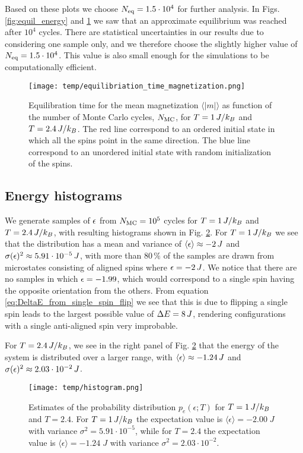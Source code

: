 Based on these plots we choose $N_\mathrm{eq}=1.5\cdot10^4$ for further analysis. In Figs. \ref{fig:equil_energy} and \ref{fig:equil_magn} we saw that an approximate equilibrium was reached after $10^4$ cycles. There are statistical uncertainties in our results due to considering one sample only, and we therefore choose the slightly higher value of $N_\mathrm{eq}=1.5\cdot10^4$. This value is also small enough for the simulations to be computationally efficient.

\begin{figure}[!ht]
    \texttt{[image: temp/equilibriation\_time\_magnetization.png]}
    \caption{Equilibration time for the mean magnetization $\langle \vert m \vert \rangle$ as function of the number of Monte Carlo cycles, $N_\mathrm{MC}$, for $T=1\,J/k_B$ and $T=2.4\,J/k_B$. The red line correspond to an ordered initial state in which all the spins point in the same direction. The blue line correspond to an unordered initial state with random initialization of the spins.}
    \label{fig:equil_magn}
\end{figure}

\subsection{Energy histograms}\label{subsec_results:histogram}
We generate samples of $\epsilon$ from $N_\mathrm{MC}=10^5$ cycles for $T=1\,J/k_B$ and $T=2.4\,J/k_B$, with resulting histograms shown in Fig. \ref{fig:histogram}. For $T=1\,J/k_B$ we see that the distribution has a mean and variance of $\expval{\epsilon}\approx-2\,J$ and $\sigma(\epsilon)^2\approx5.91\cdot10^{-5}\,J$, with more than $80\,\%$ of the samples are drawn from microstates consisting of aligned spins where $\epsilon=-2\,J$. We notice that there are no samples in which $\epsilon=-1.99$, which would correspond to a single spin having the opposite orientation from the others. From equation \eqref{eq:DeltaE_from_single_spin_flip} we see that this is due to flipping a single spin leads to the largest possible value of $\Delta E=8\,J$, rendering configurations with a single anti-aligned spin very improbable. 

For $T=2.4\,J/k_B$, we see in the right panel of Fig. \ref{fig:histogram} that the energy of the system is distributed over a larger range, with $\expval{\epsilon}\approx-1.24\,J$ and $\sigma(\epsilon)^2 \approx2.03\cdot10^{-2}\,J$. 
\begin{figure}[!ht]
    \texttt{[image: temp/histogram.png]}
    \caption{Estimates of the probability distribution $p_e(\epsilon; T)$ for $T=1\,J/k_B$ and $T=2.4$. For $T=1\,J/k_B$ the expectation value is $\langle \epsilon \rangle = -2.00 \; J$ with variance $\sigma^2 = 5.91\cdot 10^{-5}$, while for $T=2.4$ the expectation value is $\langle \epsilon \rangle = -1.24 \; J$ with variance $\sigma^2=2.03\cdot 10^{-2}$.}
    \label{fig:histogram}
\end{figure}

